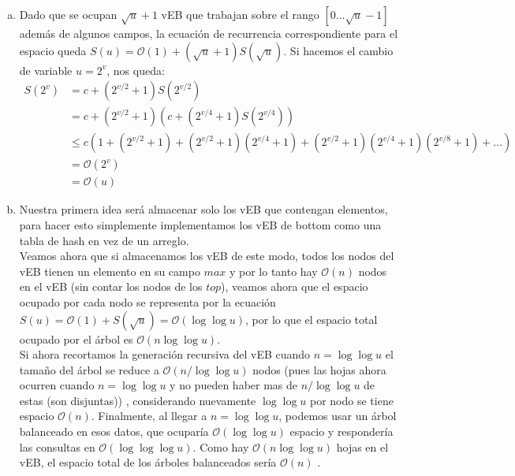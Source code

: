 \documentclass[dcc,uchile]{fcfmcourse}
\theoremstyle{plain}
\theoremstyle{definition}
\begin{document}
\begin{problems}
\begin{enumerate}[a)]
    \item Dado que se ocupan $\sqrt{u}+1$ vEB que trabajan sobre el rango $[0\ldots \sqrt{u}-1]$ además de algunos campos, la ecuación de recurrencia correspondiente para el espacio queda $S(u) = \mathcal{O}(1) + (\sqrt{u}+1)S(\sqrt{u})$. Si hacemos el cambio de variable $u = 2^v$, nos queda:
    \begin{align*}
        S(2^v) &= c + (2^{v/2}+1)S(2^{v/2})\\
        &= c + (2^{v/2}+1)(c + (2^{v/4}+1)S(2^{v/4}))\\
        &\le  c(1+(2^{v/2}+1)+(2^{v/2}+1)(2^{v/4}+1) + (2^{v/2}+1)(2^{v/4}+1)(2^{v/8}+1)+ \ldots)\\
        &= \mathcal{O}(2^v)\\
        &= \mathcal{O}(u)
    \end{align*}
    \item Nuestra primera idea será almacenar solo los vEB que contengan elementos, para hacer esto simplemente implementamos los vEB de bottom como una tabla de hash en vez de un arreglo.\\
    Veamos ahora que si almacenamos los vEB de este modo, todos los nodos del vEB tienen un elemento en su campo $max$ y por lo tanto hay $\mathcal{O}(n)$ nodos en el vEB (sin contar los nodos de los $top$), veamos ahora que el espacio ocupado por cada nodo se representa por la ecuación $S(u) = \mathcal{O}(1) + S(\sqrt{u}) = \mathcal{O}(\log{\log{u}})$, por lo que el espacio total ocupado por el árbol es $\mathcal{O}(n\log{\log{u}})$.\\
    
    Si ahora recortamos la generación recursiva del vEB cuando $n =  \log{\log{u}}$ el tamaño del árbol se reduce a $\mathcal{O}(n/\log{\log{u}})$ nodos (pues las hojas ahora ocurren cuando $n=\log{\log{u}}$ y no pueden haber mas de $n/\log{\log{u}}$ de estas (son disjuntas)) , considerando nuevamente $\log{\log{u}}$ por nodo se tiene espacio $\mathcal{O}(n)$. Finalmente, al llegar a $n =  \log{\log{u}}$, podemos usar un árbol balanceado en esos datos, que ocuparía $\mathcal{O}(\log{\log{u}})$ espacio y respondería las consultas en $\mathcal{O}(\log{\log{\log{u}}})$. Como hay $\mathcal{O}(n\log{\log{u}})$ hojas en el vEB, el espacio total de los árboles balanceados sería $\mathcal{O}(n)$ .\\
    

\end{enumerate}
\end{problems}
\end{document}

